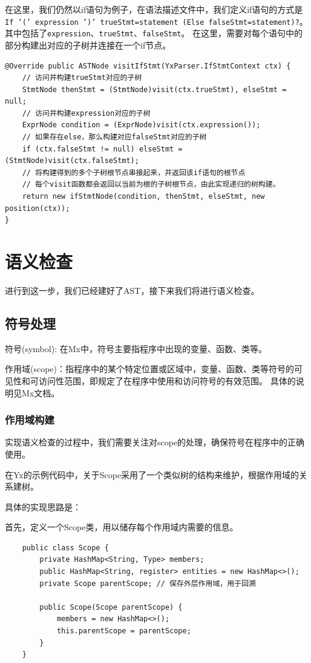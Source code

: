 在这里，我们仍然以if语句为例子，在语法描述文件中，我们定义if语句的方式是\texttt{If '(' expression ')' trueStmt=statement (Else falseStmt=statement)?}。
其中包括了\texttt{expression}、\texttt{trueStmt}、\texttt{falseStmt}。
在这里，需要对每个语句中的部分构建出对应的子树并连接在一个if节点。
\begin{lstlisting}
@Override public ASTNode visitIfStmt(YxParser.IfStmtContext ctx) {
    // 访问并构建trueStmt对应的子树
    StmtNode thenStmt = (StmtNode)visit(ctx.trueStmt), elseStmt = null;
    // 访问并构建expression对应的子树
    ExprNode condition = (ExprNode)visit(ctx.expression());
    // 如果存在else，那么构建对应falseStmt对应的子树
    if (ctx.falseStmt != null) elseStmt = (StmtNode)visit(ctx.falseStmt);
    // 将构建得到的多个子树根节点串接起来，并返回该if语句的根节点
    // 每个visit函数都会返回以当前为根的子树根节点，由此实现递归的树构建。
    return new ifStmtNode(condition, thenStmt, elseStmt, new position(ctx));
}
\end{lstlisting}


\section{语义检查}
进行到这一步，我们已经建好了AST，接下来我们将进行语义检查。

\subsection{符号处理}
符号(symbol): 在Mx中，符号主要指程序中出现的变量、函数、类等。

作用域(scope)：指程序中的某个特定位置或区域中，变量、函数、类等符号的可见性和可访问性范围，即规定了在程序中使用和访问符号的有效范围。
具体的说明见Mx文档。

\subsubsection{作用域构建}
实现语义检查的过程中，我们需要关注对scope的处理，确保符号在程序中的正确使用。

在Yx的示例代码中，关于Scope采用了一个类似树的结构来维护，根据作用域的关系建树。

具体的实现思路是：

首先，定义一个Scope类，用以储存每个作用域内需要的信息。
\begin{lstlisting}
    public class Scope {
        private HashMap<String, Type> members;
        public HashMap<String, register> entities = new HashMap<>();
        private Scope parentScope; // 保存外层作用域，用于回溯

        public Scope(Scope parentScope) {
            members = new HashMap<>();
            this.parentScope = parentScope;
        }
    }
\end{lstlisting}

